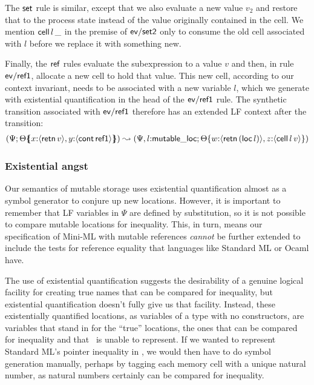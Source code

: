 The ${\sf set}$ rule is similar, except that we also evaluate a new value
$v_2$ and restore that to the process state instead of the value originally
contained in the cell. We mention ${\sf cell}\,l\,\_$ in the
premise of ${\sf ev/set2}$ only to consume the old cell associated with $l$
before we replace it with something new.

Finally, the ${\sf ref}$ rules evaluate the subexpression to a value
$v$ and then, in rule ${\sf ev/ref1}$, allocate a new cell to hold
that value. This new cell, according to our context invariant, needs
to be associated with a new variable $l$, which we generate with
existential quantification in the head of the ${\sf ev/ref1}$ rule.
The synthetic transition associated with ${\sf ev/ref1}$ therefore has
an extended LF context after the transition:
\begin{align*}
(\Psi;  {\Theta}\mbox{$\{\hspace{-4pt}\{$}{x{:}\langle {{\sf retn}\,v} \rangle, y{:}\langle {{\sf cont}\,{\sf ref1}} \rangle}\mbox{$\}\hspace{-4pt}\}$})
\leadsto 
(\Psi, l{:}{\sf mutable\_loc}; {\Theta}\{{w{:}\langle {{\sf retn}\,({\sf loc}\,l)} \rangle,
z{:}\langle {{\sf cell}\,l\,v} \rangle}\})
\end{align*}

\subsubsection{Existential angst} 

Our semantics of mutable storage uses existential quantification almost 
as a symbol generator to conjure up new locations. However, it is important
to remember that LF variables in $\Psi$ are defined by substitution, so it
is not possible to compare mutable locations for inequality. This, in turn,
means our specification of Mini-ML with mutable references {\it cannot}
be further extended to include the tests for reference equality that 
languages like Standard ML or Ocaml have. 

The use of existential quantification suggests the desirability of a
genuine logical facility for creating true names that can be compared
for inequality, but existential quantification doesn't fully give us
that facility. Instead, these existentially quantified locations, as
variables of a type with no constructors, are variables that stand in
for the ``true'' locations, the ones that can be compared for
inequality and that \sls~is unable to represent.  If we wanted to
represent Standard ML's pointer inequality in \sls, we would then have
to do symbol generation manually, perhaps by tagging each memory cell
with a unique natural number, as natural numbers certainly can be
compared for inequality.

